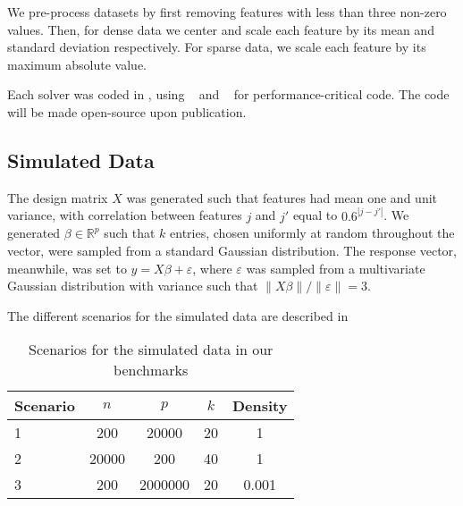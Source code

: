 We pre-process datasets by first removing features with less than three non-zero values. Then, for dense data we center and scale each feature by its mean and standard deviation respectively.
For sparse data, we scale each feature by its maximum absolute value.

Each solver was coded in , using ~\parencite{harris2020} and ~\parencite{lam2015} for performance-critical code.
The code will be made open-source upon publication.



\subsection{Simulated Data}
\label{sec:experiments-real-data}

The design matrix $X$ was generated such that features had mean one and unit variance, with correlation between features $j$ and $j'$ equal to $0.6^{|j-j'|}$.
We generated \(\beta \in \mathbb{R}^p\) such that \(k\) entries, chosen uniformly at random throughout the vector, were sampled from a standard Gaussian distribution.
The response vector, meanwhile, was set to $y=X\beta + \varepsilon$, where
$\varepsilon$ was sampled from a multivariate Gaussian distribution with variance such that $\lVert X\beta\rVert / \lVert \varepsilon \rVert = 3$.

The different scenarios for the simulated data are described in 

\begin{table}[hbt]
  \centering
  \caption{Scenarios for the simulated data in our benchmarks}
  \label{tab:simulated-data}
  \begin{tabular}{
      l
      S[table-format=5.0,round-mode=off]
      S[table-format=7.0,round-mode=off]
      S[table-format=2.0,round-mode=off]
      S[table-format=1.3,round-mode=off]
    }
    \toprule
    {Scenario} & {\(n\)} & {\(p\)} & {\(k\)} & {Density} \\           & 200     & 20000   & 20      & 1         \\
    2          & 20000   & 200     & 40      & 1         \\
    3          & 200     & 2000000 & 20      & 0.001     \\ \bottomrule
  \end{tabular}
\end{table}


